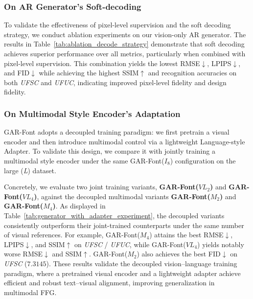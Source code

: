 \subsubsection{On AR Generator's Soft-decoding}
To validate the effectiveness of pixel-level supervision and the soft decoding strategy, we conduct ablation experiments on our vision-only AR generator.
The results in Table~\ref{tab:ablation_decode_strategy} demonstrate that soft decoding achieves superior performance over all metrics, particularly when combined with pixel-level supervision. 
This combination yields the lowest RMSE$\downarrow$, LPIPS$\downarrow$, and FID$\downarrow$ while achieving the highest SSIM$\uparrow$ and recognition accuracies on both \textit{UFSC} and \textit{UFUC}, indicating improved pixel-level fidelity and design fidelity. %


\subsubsection{On Multimodal Style Encoder's Adaptation}
GAR-Font adopts a decoupled training paradigm: we first pretrain a visual encoder and then introduce multimodal control via a lightweight Language-style Adapter. To validate this design, we compare it with jointly training a multimodal style encoder under the same GAR-Font($I_8$) configuration on the large (\textit{L}) dataset.

Concretely, we evaluate two joint training variants, \textbf{GAR-Font($VL_2$)} and \textbf{GAR-Font($VL_4$)}, against the decoupled multimodal variants \textbf{GAR-Font($M_2$)} and \textbf{GAR-Font($M_4$)}. As displayed in Table~\ref{tab:generator_with_adapter_experiment}, the decoupled variants consistently outperform their joint-trained counterparts under the same number of visual references. For example, GAR-Font($M_4$) attains the best RMSE$\downarrow$, LPIPS$\downarrow$, and SSIM$\uparrow$ on \textit{UFSC} / \textit{UFUC}, while GAR-Font($VL_4$) yields notably worse RMSE$\downarrow$ and SSIM$\uparrow$. GAR-Font($M_2$) also achieves the best FID$\downarrow$ on \textit{UFSC} ($7.3145$). These results validate the decoupled vision–language training paradigm, where a pretrained visual encoder and a lightweight adapter achieve efficient and robust text–visual alignment, improving generalization in multimodal FFG.

